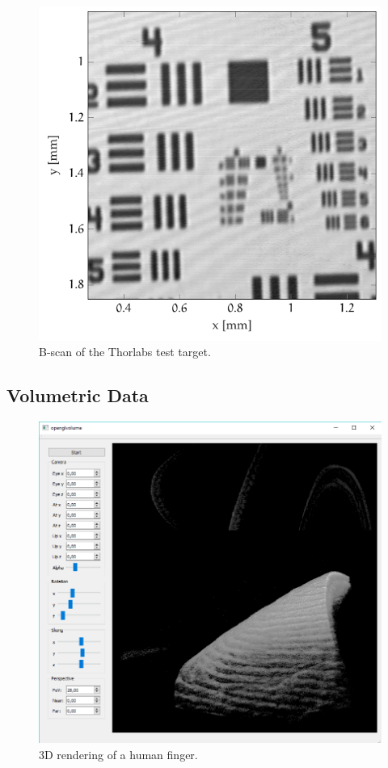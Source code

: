 \begin{figure}[hbt]
	\centering
	\includegraphics[width=0.6\linewidth]{gfx/ch4/axsun/target/usaf}
	\caption{B-scan of the Thorlabs test target.}\label{fig:target-usaf}
\end{figure}






\FloatBarrier
\subsection{Volumetric Data}
    \begin{figure}[hbt]
        \centering
        \includegraphics[width=0.8\linewidth]{gfx/3d/finger}
        \caption[]{3D rendering of a human finger.}\label{fig:finger-3d}
    \end{figure}

